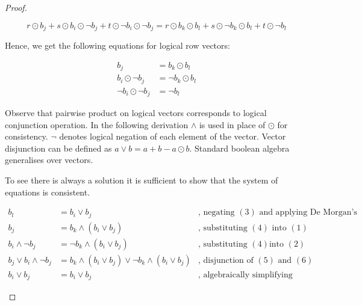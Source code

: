 \begin{proof}
\begin{description}
    $$r \odot b_j + s \odot b_i \odot \neg b_j + t \odot \neg b_i \odot \neg b_j
    = r \odot b_k \odot b_l + s \odot \neg b_k \odot b_l + t \odot \neg b_l$$

    Hence, we get the following equations for logical row vectors:

    \begin{align}
      b_j & = b_k \odot b_l \\
      b_i \odot \neg b_j & = \neg b_k \odot b_l \\
      \neg b_i \odot \neg b_j & = \neg b_l
    \end{align}

    Observe that pairwise product on logical vectors corresponds to logical
    conjunction operation. In the following derivation $\wedge$ is used in place
    of $\odot$ for consistency. $\neg$ denotes logical negation of each element
    of the vector. Vector disjunction can be defined as $a \vee b = a + b - a
    \odot b$. Standard boolean algebra generalises over vectors.

    To see there is always a solution it is sufficient to show that the system
    of equations is consistent.

    \begin{align}
      b_l &= b_i \vee b_j & \mbox{, negating $(3)$ and applying De Morgan's law} \\
      b_j &= b_k \wedge (b_i \vee b_j) & \mbox{, substituting $(4)$ into $(1)$} \\
      b_i \wedge \neg b_j &= \neg b_k \wedge (b_i \vee b_j) & \mbox{, substituting $(4)$
        into $(2)$} \\
      b_j \vee b_i \wedge \neg b_j &= b_k \wedge (b_i \vee b_j) \vee \neg b_k \wedge (b_i \vee b_j) & \mbox{, disjunction of $(5)$ and $(6)$} \\
      b_i \vee b_j &= b_i \vee b_j & \mbox{, algebraically simplifying (7)} \nonumber
    \end{align}


\end{description}
\end{proof}
